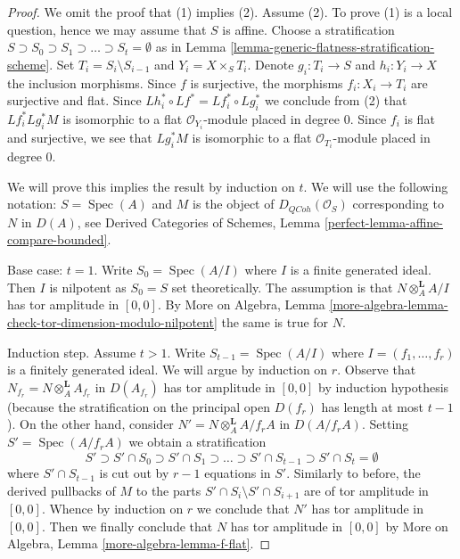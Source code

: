 \documentclass[10pt,a4paper]{amsart}
\theoremstyle{plain}
\theoremstyle{definition}
\theoremstyle{remark}
\numberwithin{equation}{subsection}
\def\Spec{\mathop{\mathrm{Spec}}}
\def\QCoh{\mathit{QCoh}}
\begin{document}
\begin{proof}
We omit the proof that (1) implies (2). Assume (2). To prove (1)
is a local question, hence we may assume that $S$ is affine.
Choose a stratification
$S \supset S_0 \supset S_1 \supset \ldots \supset S_t = \emptyset$
as in Lemma \ref{lemma-generic-flatness-stratification-scheme}.
Set $T_i = S_i \setminus S_{i - 1}$ and $Y_i = X \times_S T_i$.
Denote $g_i : T_i \to S$ and $h_i : Y_i \to X$ the inclusion morphisms.
Since $f$ is surjective, the morphisms $f_i : X_i \to T_i$
are surjective and flat. Since
$Lh_i^* \circ Lf^* = Lf_i^* \circ Lg_i^*$ we conclude from (2) that
$Lf_i^* Lg_i^*M$ is isomorphic to a flat $\mathcal{O}_{Y_i}$-module
placed in degree $0$. Since $f_i$ is flat and surjective, we see that
$Lg_i^*M$ is isomorphic to a flat $\mathcal{O}_{T_i}$-module
placed in degree $0$.

\medskip\noindent
We will prove this implies the result by induction on $t$.
We will use the following notation: $S = \Spec(A)$ and $M$
is the object of $D_\QCoh(\mathcal{O}_S)$ corresponding to
$N$ in $D(A)$, see Derived Categories of Schemes, Lemma
\ref{perfect-lemma-affine-compare-bounded}.

\medskip\noindent
Base case: $t = 1$. Write $S_0 = \Spec(A/I)$ where
$I$ is a finite generated ideal. Then $I$ is nilpotent as $S_0 = S$
set theoretically. The assumption is that $N \otimes_A^\mathbf{L} A/I$
has tor amplitude in $[0, 0]$. By More on Algebra, Lemma
\ref{more-algebra-lemma-check-tor-dimension-modulo-nilpotent}
the same is true for $N$.

\medskip\noindent
Induction step. Assume $t > 1$. Write $S_{t - 1} = \Spec(A/I)$
where $I = (f_1, \ldots, f_r)$ is a finitely generated ideal.
We will argue by induction on $r$. Observe that
$N_{f_r} = N \otimes_A^\mathbf{L} A_{f_r}$ in $D(A_{f_r})$
has tor amplitude in $[0, 0]$ by induction hypothesis
(because the stratification on the principal open $D(f_r)$ has length
at most $t - 1$). On the other hand, consider
$N' = N \otimes_A^\mathbf{L} A/f_rA$ in $D(A/f_rA)$.
Setting $S' = \Spec(A/f_rA)$ we obtain a stratification
$$
S' \supset S' \cap S_0 \supset S' \cap S_1 \supset \ldots \supset
S' \cap S_{t - 1} \supset
S' \cap S_t = \emptyset
$$
where $S' \cap S_{t - 1}$ is cut out by $r - 1$ equations in $S'$.
Similarly to before, the derived pullbacks of $M$ to the parts
$S' \cap S_i \setminus S' \cap S_{i + 1}$ are of tor amplitude
in $[0, 0]$. Whence by induction on $r$ we conclude that
$N'$ has tor amplitude in $[0, 0]$.
Then we finally conclude that $N$ has tor amplitude in $[0, 0]$
by More on Algebra, Lemma \ref{more-algebra-lemma-f-flat}.
\end{proof}
\end{document}
